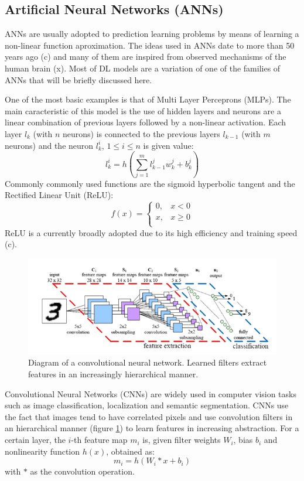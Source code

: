 \documentclass[English]{style/ic-tese-v3}
\begin{document}
\subsection{Artificial Neural Networks (ANNs)}
ANNs are usually adopted to prediction
learning problems by means of learning a non-linear function aproximation.
The ideas used in ANNs date to more than 50 years ago (c) and many of them
are inspired from observed mechanisms of the human brain (x).
Most of DL models are a variation of one of the families of ANNs
that will be briefly discussed here.

One of the most basic examples is that of Multi Layer Perceprons (MLPs).
The main caracteristic of this model is the use of hidden layers
and neurons are a linear combination of previous layers followed by
a non-linear activation.
Each layer $l_k$ (with $n$ neurons) is connected to the previous layers
$l_{k-1}$ (with $m$ neurons) and the neuron $l_k^i$, $1 \le i \le n$
is given value:
$$l_k^i = h\left(\sum_{j=1}^{m} l_{k-1}^jw_k^j + b_k^j\right)$$
Commonly commonly used functions are the sigmoid hyperbolic tangent
and the Rectified Linear Unit (ReLU):
$$f(x) = \begin{cases}
    0, & x < 0 \\
    x, & x \ge 0 \\
        \end{cases}
$$
ReLU is a currently broadly adopted due to its high efficiency
and training speed (c).

\begin{figure}
\begin{center}
    \includegraphics[width=1.0\linewidth]{./img/cnn.png}
\caption{
    Diagram of a convolutional neural network.
    Learned filters extract features in an increasingly hierarchical manner.
}
\label{fig:cnn}
\end{center}
\end{figure}

Convolutional Neural Networks (CNNs) are widely used
in computer vision
tasks such as image classification, localization and semantic segmentation.
CNNs use the fact that images tend to have correlated pixels and use
convolution filters in an hierarchical manner (figure \ref{fig:cnn})
to learn features in increasing abstraction.
For a certain layer, the $i$-th feature map $m_i$ is,
given filter weights $W_i$, bias $b_i$ and nonlinearity function $h(x)$,
obtained as:
$$m_i = h\left(W_i * x + b_i\right)$$
with $*$ as the convolution operation.
\end{document}
